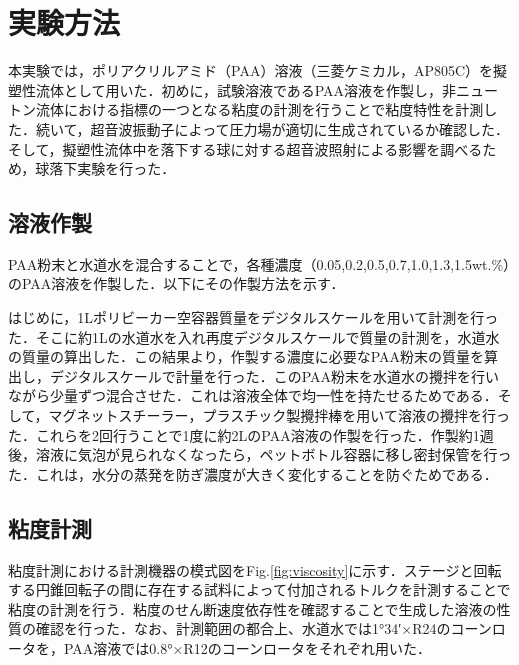 \section{実験方法}
\label{sec:methods}
本実験では，ポリアクリルアミド（PAA）溶液（三菱ケミカル，AP805C）を擬塑性流体として用いた．初めに，試験溶液であるPAA溶液を作製し，非ニュートン流体における指標の一つとなる粘度の計測を行うことで粘度特性を計測した．続いて，超音波振動子によって圧力場が適切に生成されているか確認した．そして，擬塑性流体中を落下する球に対する超音波照射による影響を調べるため，球落下実験を行った．

\subsection{溶液作製}

PAA粉末と水道水を混合することで，各種濃度（0.05,0.2,0.5,0.7,1.0,1.3,1.5wt.\%）のPAA溶液を作製した．以下にその作製方法を示す．

はじめに，1Lポリビーカー空容器質量をデジタルスケールを用いて計測を行った．そこに約1Lの水道水を入れ再度デジタルスケールで質量の計測を，水道水の質量の算出した．この結果より，作製する濃度に必要なPAA粉末の質量を算出し，デジタルスケールで計量を行った．このPAA粉末を水道水の攪拌を行いながら少量ずつ混合させた．これは溶液全体で均一性を持たせるためである．そして，マグネットスチーラー，プラスチック製攪拌棒を用いて溶液の攪拌を行った．これらを2回行うことで1度に約2LのPAA溶液の作製を行った．作製約1週後，溶液に気泡が見られなくなったら，ペットボトル容器に移し密封保管を行った．これは，水分の蒸発を防ぎ濃度が大きく変化することを防ぐためである．

\subsection{粘度計測}
粘度計測における計測機器の模式図をFig.\ref{fig:viscosity}に示す．ステージと回転する円錐回転子の間に存在する試料によって付加されるトルクを計測することで粘度の計測を行う．粘度のせん断速度依存性を確認することで生成した溶液の性質の確認を行った．なお、計測範囲の都合上、水道水では1°34′×R24のコーンロータを，PAA溶液では0.8°×R12のコーンロータをそれぞれ用いた．

